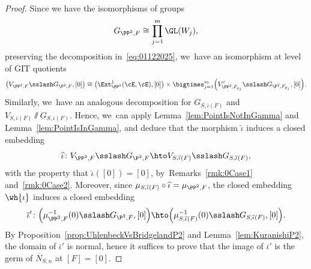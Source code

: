 \begin{proof}
Since we have the isomorphisms of groups
\[
G_{\PP^2,F}\cong\prod_{j=1}^m\GL(W_j),
\]
preserving the decomposition in~\eqref{eq:01122025}, we~have an isomorphism at level of GIT quotients
\[
\left(V_{\PP^2,F}\sslash G_{\P^2,F},[0]\right)\cong\left(\Ext^1_{\PP^2}(\cE,\cE),[0]\right)\times\bigtimes_{j=1}^m \Bigl(V_{\PP^2,F_{p_j}}'\sslash G_{\P^2,F_{p_j}},[0]\Bigr).
\]
Similarly, we~have an analogous decomposition for $G_{S,\overline{\iota}(F)}$ and $V_{S,\overline{\iota}(F)}\sslash G_{S,\overline{\iota}(F)}$.
Hence, we~can apply Lemma~\ref{lem:PointIsNotInGamma} and Lemma~\ref{lem:PointIsInGamma}, and deduce that the morphism $\widetilde{\iota}$ induces a closed embedding
\[
\widehat{\iota}\colon V_{\PP^2,F}\sslash G_{\P^2,F} \hto V_{S,\overline{\iota}(F)}\sslash G_{S,\overline{\iota}(F)},
\]
with the property that $\widehat{\iota}([0])=[0]$, by~Remarks~\ref{rmk:0Case1} and~\ref{rmk:0Case2}.
Moreover, since $\mu_{S,\overline{\iota}(F)}\circ\widehat{\iota}=\mu_{\PP^2,F}$, the closed embedding $\wh{\iota}$ induces a closed embedding
\[
\overline{\iota}'\colon \Bigl(\mu_{\PP^2,F}^{-1}(0)\sslash G_{\P^2,F},[0] \Bigr) \hto \Bigl(\mu_{S,\overline{\iota}(F)}^{-1}(0)\sslash G_{S,\overline{\iota}(F)},[0] \Bigr).
\]
By Proposition~\ref{prop:UhlenbeckVsBridgelandP2} and Lemma~\ref{lem:KuranishiP2}, the domain of $\overline{\iota}'$ is normal, hence it suffices to prove that the image of $\overline{\iota}'$ is the germ of $ \overline{N}_{S,n}$ at $[F]=[0]$.


\end{proof}
